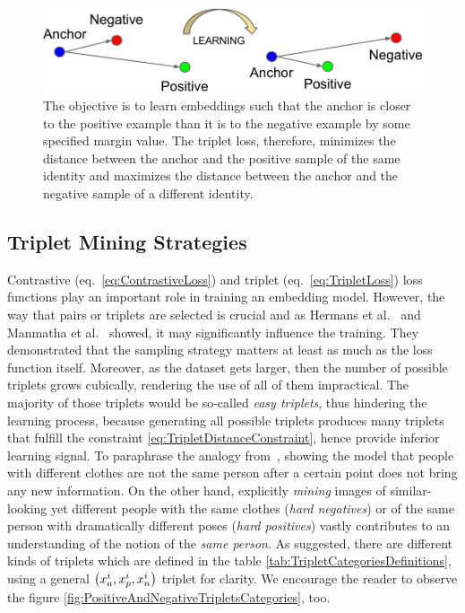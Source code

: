 \begin{figure}[t]
    \centerline{\includegraphics[width=0.7\linewidth]{figures/theoretical_foundations/triplet_loss_learning_process.pdf}}
    \caption[Triplet loss learning]{The objective is to learn embeddings such that the anchor is closer to the positive example than it is to the negative example by some specified margin value. The triplet loss, therefore, minimizes the distance between the anchor and the positive sample of the same identity and maximizes the distance between the anchor and the negative sample of a different identity. }
    \label{fig:TripletLossLearningProcess}
\end{figure}

\subsection{Triplet Mining Strategies}
\label{ssec:TripletMiningStrategies}

Contrastive (eq.~\ref{eq:ContrastiveLoss}) and triplet (eq.~\ref{eq:TripletLoss}) loss functions play an important role in training an embedding model. However, the way that pairs or triplets are selected is crucial and as Hermans et al.~\cite{hermans2017triplet} and Manmatha et al.~\cite{manmatha2017samplingmatters} showed, it may significantly influence the training. They demonstrated that the sampling strategy matters at least as much as the loss function itself. Moreover, as the dataset gets larger, then the number of possible triplets grows cubically, rendering the use of all of them impractical. The majority of those triplets would be so-called \emph{easy triplets}, thus hindering the learning process, because generating all possible triplets produces many triplets that fulfill the constraint \ref{eq:TripletDistanceConstraint}, hence provide inferior learning signal. To paraphrase the analogy from~\cite{hermans2017triplet}, showing the model that people with different clothes are not the same person after a certain point does not bring any new information. On the other hand, explicitly \emph{mining} images of similar-looking yet different people with the same clothes (\emph{hard negatives}) or of the same person with dramatically different poses (\emph{hard positives}) vastly contributes to an understanding of the notion of the \emph{same person}. As suggested, there are different kinds of triplets which are defined in the table \ref{tab:TripletCategoriesDefinitions}, using a general $\left( {x_a^i, x_p^i, x_n^i} \right)$ triplet for clarity. We encourage the reader to observe the figure \ref{fig:PositiveAndNegativeTripletsCategories}, too.

